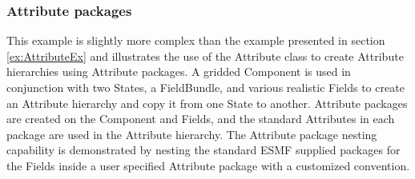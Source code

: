  
\setlength{\oldparskip}{\parskip}
\setlength{\parskip}{1.5ex}
\setlength{\oldparindent}{\parindent}
\setlength{\parindent}{0pt}
\setlength{\oldbaselineskip}{\baselineskip}
\setlength{\baselineskip}{11pt}
 
\def\bv{\begin{verbatim}}
\def\ev{\end{verbatim}}
\def\be{\begin{equation}}
\def\ee{\end{equation}}
\def\bea{\begin{eqnarray}}
\def\eea{\end{eqnarray}}
\def\bi{\begin{itemize}}
\def\ei{\end{itemize}}
\def\bn{\begin{enumerate}}
\def\en{\end{enumerate}}
\def\bd{\begin{description}}
\def\ed{\end{description}}
\def\({\left (}
\def\){\right )}
\def\[{\left [}
\def\]{\right ]}
\def\<{\left  \langle}
\def\>{\right \rangle}
\def\cI{{\cal I}}
\def\diag{\mathop{\rm diag}}
\def\tr{\mathop{\rm tr}}


 

   \subsubsection{Attribute packages} \label{ex:AttributePackageEx}
  
   This example is slightly more complex than the example presented in section
   \ref{ex:AttributeEx} and illustrates the use of the Attribute class to
   create Attribute hierarchies using Attribute packages.  A gridded Component
   is used in conjunction with two States, a FieldBundle, and various realistic
   Fields to create an Attribute hierarchy and copy it from one State to another.
   Attribute packages are created on the Component and Fields, and the
   standard Attributes in each package are used in the Attribute hierarchy.
   The Attribute package nesting capability is demonstrated by nesting the standard
   ESMF supplied packages for the Fields inside a user specified Attribute package
   with a customized convention. 

